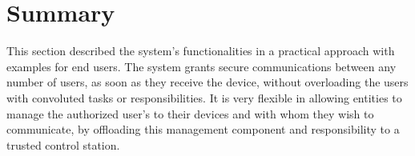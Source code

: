 \section{Summary}\label{chap:arch:summary}

This section described the system's functionalities in a practical approach with examples for end users.
The system grants secure communications between any number of users, as soon as they receive the device, without overloading the users with convoluted tasks or responsibilities.
It is very flexible in allowing entities to manage the authorized user's to their devices and with whom they wish to communicate, by offloading this management component and responsibility to a trusted control station.
